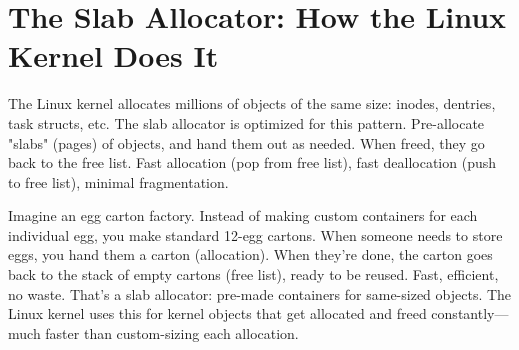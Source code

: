\section{The Slab Allocator: How the Linux Kernel Does It}

The Linux kernel allocates millions of objects of the same size: inodes, dentries, task structs, etc. The slab allocator is optimized for this pattern. Pre-allocate "slabs" (pages) of objects, and hand them out as needed. When freed, they go back to the free list. Fast allocation (pop from free list), fast deallocation (push to free list), minimal fragmentation.

Imagine an egg carton factory. Instead of making custom containers for each individual egg, you make standard 12-egg cartons. When someone needs to store eggs, you hand them a carton (allocation). When they're done, the carton goes back to the stack of empty cartons (free list), ready to be reused. Fast, efficient, no waste. That's a slab allocator: pre-made containers for same-sized objects. The Linux kernel uses this for kernel objects that get allocated and freed constantly---much faster than custom-sizing each allocation.

